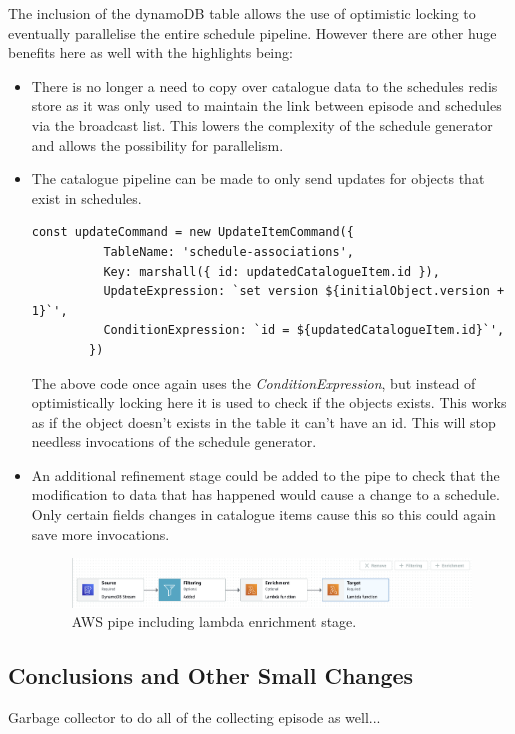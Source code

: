   The inclusion of the dynamoDB table allows the use of optimistic locking to eventually parallelise the entire schedule pipeline. However there are 
  other huge benefits here as well with the highlights being:

  \begin{itemize}
    \item There is no longer a need to copy over catalogue data to the schedules redis store as it was only used to maintain the link between episode and 
    schedules via the broadcast list. This lowers the complexity of the schedule generator and allows the possibility for parallelism.
    \item The catalogue pipeline can be made to only send updates for objects that exist in schedules. 
      \begin{lstlisting}[caption=SDK command sent by catalogue pipeline to ignore non schedule related catalogue items.]
        const updateCommand = new UpdateItemCommand({
          TableName: 'schedule-associations',
          Key: marshall({ id: updatedCatalogueItem.id }),
          UpdateExpression: `set version ${initialObject.version + 1}`',
          ConditionExpression: `id = ${updatedCatalogueItem.id}`',
        })
      \end{lstlisting} 
      The above code once again uses the \emph{ConditionExpression}, but instead of optimistically locking here it is used to check if the objects exists.
      This works as if the object doesn't exists in the table it can't have an id. This will stop needless invocations of the schedule generator.
    \item An additional refinement stage could be added to the pipe to check that the modification to data that has happened would cause a change to a
    schedule. Only certain fields changes in catalogue items cause this so this could again save more invocations.
  
      \begin{figure}[H]
        \centering
        \includegraphics[width=12cm]{assets/awsPipeFull.png}
        \caption{AWS pipe including lambda enrichment stage.}
        \label{fig:awsPipeFull}
      \end{figure}
  \end{itemize}

  \subsection{Conclusions and Other Small Changes}
  \label{sec:conclusion}
  Garbage collector to do all of the collecting episode as well...
\newpage
